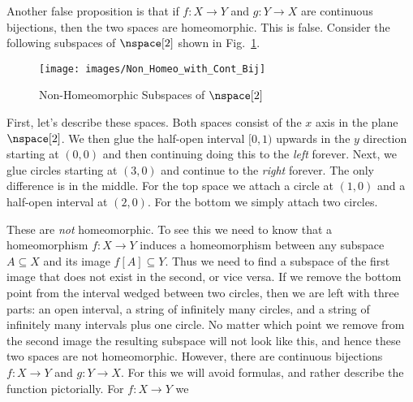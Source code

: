 \documentclass{book}                                                           %
\begin{document}
                Another false proposition is that if $f:X\rightarrow{Y}$ and
                $g:Y\rightarrow{X}$ are continuous bijections, then the two
                spaces are homeomorphic. This is false. Consider the following
                subspaces of $\nspace[2]$ shown in
                Fig.~\ref{fig:Non_Homeomorphic_Subspace}.
                \begin{figure}[H]
                    \centering
                    \captionsetup{type=figure}
                    \texttt{[image: images/Non\_Homeo\_with\_Cont\_Bij]}
                    \caption{Non-Homeomorphic Subspaces of $\nspace[2]$}
                    \label{fig:Non_Homeomorphic_Subspace}
                \end{figure}
                First, let's describe these spaces. Both spaces consist of the
                $x$ axis in the plane $\nspace[2]$. We then glue the half-open
                interval $[0,1)$ upwards in the $y$ direction starting at
                $(0,0)$ and then continuing doing this to the \textit{left}
                forever. Next, we glue circles starting at $(3,0)$ and continue
                to the \textit{right} forever. The only difference is in the
                middle. For the top space we attach a circle at $(1,0)$ and a
                half-open interval at $(2,0)$. For the bottom we simply attach
                two circles.
                \par\hfill\par
                These are \textit{not} homeomorphic. To see this we need to know
                that a homeomorphism $f:X\rightarrow{Y}$ induces a
                homeomorphism between any subspace $A\subseteq{X}$ and its image
                $f[A]\subseteq{Y}$. Thus we need to find a subspace of the first
                image that does not exist in the second, or vice versa. If we
                remove the bottom point from the interval wedged between two
                circles, then we are left with three parts: an open interval,
                a string of infinitely many circles, and a string of infinitely
                many intervals plus one circle. No matter which point we remove
                from the second image the resulting subspace will not look like
                this, and hence these two spaces are not homeomorphic. However,
                there are continuous bijections $f:X\rightarrow{Y}$ and
                $g:Y\rightarrow{X}$. For this we will avoid formulas, and rather
                describe the function pictorially. For $f:X\rightarrow{Y}$ we
\end{document}
